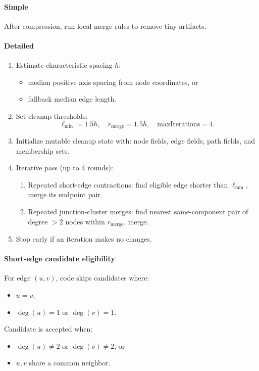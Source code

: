 \documentclass[11pt]{article}
\begin{document}
\paragraph{Simple}
After compression, run local merge rules to remove tiny artifacts.

\paragraph{Detailed}
\begin{enumerate}
  \item Estimate characteristic spacing \(h\):
  \begin{itemize}
    \item median positive axis spacing from node coordinates, or
    \item fallback median edge length.
  \end{itemize}
  \item Set cleanup thresholds:
  \[
  \ell_{\min}=1.5h,\quad r_{\text{merge}}=1.5h,\quad \text{maxIterations}=4.
  \]
  \item Initialize mutable cleanup state with:
  node fields, edge fields, path fields, and membership sets.
  \item Iterative pass (up to 4 rounds):
  \begin{enumerate}
    \item Repeated short-edge contractions:
    find eligible edge shorter than \(\ell_{\min}\), merge its endpoint pair.
    \item Repeated junction-cluster merges:
    find nearest same-component pair of degree \(>2\) nodes within \(r_{\text{merge}}\), merge.
  \end{enumerate}
  \item Stop early if an iteration makes no changes.
\end{enumerate}

\paragraph{Short-edge candidate eligibility}
For edge \((u,v)\), code skips candidates where:
\begin{itemize}
  \item \(u=v\),
  \item \(\deg(u)=1\) or \(\deg(v)=1\).
\end{itemize}
Candidate is accepted when:
\begin{itemize}
  \item \(\deg(u)\neq 2\) or \(\deg(v)\neq 2\), or
  \item \(u,v\) share a common neighbor.
\end{itemize}
\end{document}
